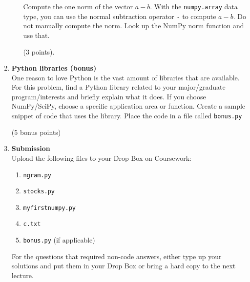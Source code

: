 \documentclass{article}
\newcounter{points}
\newcounter{bonuspoints}
\newcommand\setpoints[1]{\addtocounter{points}{#1}(#1 points)}
\newcommand\setbonuspoints[1]{\addtocounter{bonuspoints}{#1}(#1 bonus points)}
\newcommand\printpoints{Total number of points: \value{\thepoints}}
\begin{document}
\begin{enumerate}
\begin{enumerate}
Compute the one norm of the vector $a - b$.  With the \texttt{numpy.array} data type, you can use the normal subtraction operator \texttt{-} to compute $a - b$.  Do not manually compute the norm.  Look up the NumPy norm function and use that. \setpoints{3}.
\end{enumerate}

\item \textbf{Python libraries (bonus)} \\
One reason to love Python is the vast amount of libraries that are available.  For this problem, find a Python library related to your major/graduate program/interests and briefly explain what it does.  If you choose NumPy/SciPy, choose a specific application area or function.  Create a sample snippet of code that uses the library.  Place the code in a file called \texttt{bonus.py}  \setbonuspoints {5} 


\item \textbf{Submission} \\
Upload the following files to your Drop Box on Coursework:
\begin{enumerate}
\item \texttt{ngram.py}
\item \texttt{stocks.py}
\item \texttt{myfirstnumpy.py}
\item \texttt{c.txt}
\item \texttt{bonus.py} (if applicable)
\end{enumerate}

For the questions that required non-code answers, either type up your solutions and put them in your Drop Box or bring a hard copy to the next lecture.

\end{enumerate}
\end{document}
